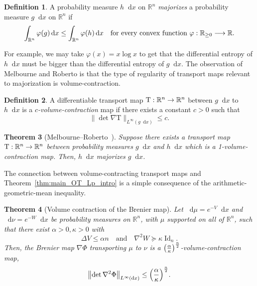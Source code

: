 \documentclass[10pt]{amsart}
\newtheorem{theo}{Theorem}[section]
\theoremstyle{definition}\newtheorem{defi}[theo]{Definition}\newtheorem{rema}[theo]{Remark}\newtheorem{exam}[theo]{Example}\newtheorem{exem}[theo]{Example}\newtheorem{nota}[theo]{Notation}
\newcommand{\R}{\mathbb R}
\DeclareMathOperator{\Id}{Id}
\newcommand{\map}{\mathrm T}
\newcommand{\V}{V}
\newcommand{\W}{W}
\newcommand{\sta}{g}
\newcommand{\fin}{h}
\newcommand{\dd}{n}
\newcommand{\source}{\mu}
\newcommand{\target}{\nu}
\newcommand{\lsh}{\alpha}
\newcommand{\lc}{\kappa}
\newcommand*\diff{\mathop{}\!\mathrm{d}}
\newcommand{\OT}{\Phi}
\newcommand{\cxfun}{\varphi}
\renewcommand*{\to}{\mathchoice{\longrightarrow}{\rightarrow}{\rightarrow}{\rightarrow}}
\let\originalleft\left
\let\originalright\right
\renewcommand{\left}{\mathopen{}\mathclose\bgroup\originalleft}
\renewcommand{\right}{\aftergroup\egroup\originalright}
\begin{document}
\begin{defi}\label{def:majorization_intro}
A probability measure $\fin\diff x$ on $\R^{\dd}$ \emph{majorizes} a probability measure $\sta \diff x$ on $\R^{\dd}$ if
\[
\int_{\R^{\dd}} \cxfun(\sta)\diff x\le \int_{\R^{\dd}} \cxfun(\fin)\diff x\quad\text{for every convex function }\varphi:\R_{\ge 0} \to \R.
\]
\end{defi}

For example, we may take $\cxfun(x)=x\log x$ to get that the differential entropy of $\fin\diff x$ must be bigger than the differential entropy of $\sta\diff x$. The observation of Melbourne and Roberto is that the type of regularity of transport maps relevant to majorization is volume-contraction.

\begin{defi}
A differentiable transport map $\map:\R^{\dd}\to \R^{\dd}$ between $\sta\diff x$ to $\fin\diff x$ is a \emph{$c$-volume-contraction} map if there exists a constant $c>0$ such that
\[
\|\det\nabla \map\|_{L^{\infty}(\sta\diff x)}\le c.
\]
\end{defi}

\begin{theo}[Melbourne--Roberto~\cite{MR2023}]\label{thm:Melbourne-Roberto_intro}
Suppose there exists a transport map $\map:\R^{\dd}\to \R^{\dd}$ between probability measures $\sta\diff x$ and $\fin \diff x$ which is a 1-volume-contraction map. Then, $\fin\diff x$ majorizes $\sta \diff x$.
\end{theo}

The connection between volume-contracting transport maps and Theorem~\ref{thm:main_OT_Lp_intro} is a simple consequence of the arithmetic-geometric-mean inequality.

\begin{theo}[Volume contraction of the Brenier map]\label{thm:volume-contraction_OT_intro}
Let $\diff\source=e^{-\V}\diff x$ and $\diff\target=e^{-\W}\diff x$ be probability measures on $\R^{\dd}$, with $\source$ supported on all of $\R^{\dd}$, such that there exist $\lsh>0,\lc>0$ with
\[
\Delta \V \le \lsh\dd \quad\text{and}\quad \nabla^2\W \succeq \lc \Id_{\dd}.
\]
Then, the Brenier map $\nabla\OT$ transporting $\source$ to $\target$ is a $\left(\frac{\lsh}{\lc}\right)^{\frac{\dd}{2}}$-volume-contraction map,
\begin{align}\label{eq:det_bound_main_intro}
\left\|\det\nabla^2\OT\right\|_{L^{\infty}(\diff x)}\le \left(\frac{\lsh}{\lc}\right)^{\frac{\dd}{2}}.
\end{align}
\end{theo}
\end{document}
